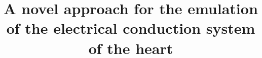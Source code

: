 \documentclass[conference]{IEEEtran}
\begin{document}
	
\title{A novel approach for the emulation of the electrical conduction system of the heart 
 }

\author{
}





\maketitle
\end{document}
